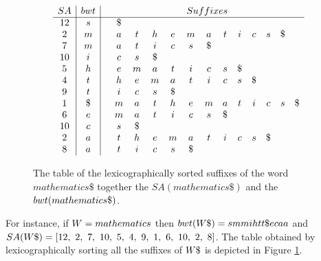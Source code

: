 \documentclass[envcountsame,runningheads]{llncs}
\begin{document}
\begin{figure}[b]
{\scriptsize
$$
\begin{array}{c|c|ccccccccccccc}
SA    & bwt   &       & \multicolumn{12}{c}{Suffixes}                                                            \\
\hline
12    & s     &       & \$    &       &       &       &       &       &       &       &       &       &       &  \\
2     & m     &       & a     & t     & h     & e     & m     & a     & t     & i     & c     & s     & \$    &  \\
7     & m     &       & a     & t     & i     & c     & s     & \$    &       &       &       &       &       &  \\
10    & i     &       & c     & s     & \$    &       &       &       &       &       &       &       &       &  \\
5     & h     &       & e     & m     & a     & t     & i     & c     & s     & \$    &       &       &       &  \\
4     & t     &       & h     & e     & m     & a     & t     & i     & c     & s     & \$    &       &       &  \\
9     & t     &       & i     & c     & s     & \$    &       &       &       &       &       &       &       &  \\
1     & \$    &       & m     & a     & t     & h     & e     & m     & a     & t     & i     & c     & s     & \$ \\
6     & e     &       & m     & a     & t     & i     & c     & s     & \$    &       &       &       &       &  \\
10    & c     &       & s     & \$    &       &       &       &       &       &       &       &       &       &  \\
2     & a     &       & t     & h     & e     & m     & a     & t     & i     & c     & s     & \$    &       &  \\
8     & a     &       & t     & i     & c     & s     & \$    &       &       &       &       &       &       &  \\
\end{array}
$$
}
\caption{The table of the lexicographically sorted suffixes of the word $mathematics\$$ together the $SA(mathematics\$)$ and the ${bwt}(mathematics\$)$.}\label{fig:bwt}
\end{figure}

For instance, if $W=mathematics$ then ${bwt}(W\$)=smmihtt\$ecaa$ and $SA(\bigT\$)=[12, \ 2, \ 7, \ 10, \ 5, \ 4, \ 9, \ 1, \ 6, \ 10, \ 2, \ 8]$. The table obtained by lexicographically sorting all the suffixes of $\bigT\$$ is depicted in Figure \ref{fig:bwt}.
\end{document}
